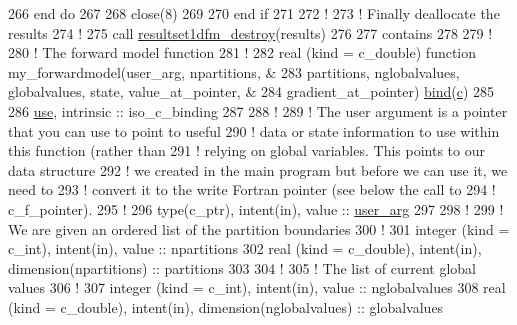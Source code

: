 \begin{DoxyCodeInclude}
266 \textcolor{keywordflow}{end do}
267 
268 \textcolor{keyword}{close}(8)
269 
270 \textcolor{keywordflow}{end if}
271 
272 \textcolor{comment}{!}
273 \textcolor{comment}{! Finally deallocate the results}
274 \textcolor{comment}{!}
275 \textcolor{keyword}{call }\hyperlink{resultset1dfm_8c_a4f089a088ba4fd4ef80d5a57b7a7f20f}{resultset1dfm\_destroy}(results)
276 
277 \textcolor{keyword}{contains}
278 
279 \textcolor{comment}{!}
280 \textcolor{comment}{! The forward model function}
281 \textcolor{comment}{!}
282 \textcolor{keyword}{real (kind = c\_double) }\textcolor{keyword}{function }my\_forwardmodel(user\_arg, npartitions, &
283      partitions, nglobalvalues, globalvalues, state, value\_at\_pointer, &
284      gradient\_at\_pointer) \hyperlink{rjmcmcf__mpi_8h_a616de1bf0c59845613650026f844fada}{bind}(\hyperlink{wellrng_8c_a6ce17b018c47d0f1d0e53a458f741ad3}{c})
285 
286   \hyperlink{rjmcmcf_8h_a821b46c311d079e47b9c09782230af02}{use}, \textcolor{keywordtype}{intrinsic} :: iso\_c\_binding 
287 
288   \textcolor{comment}{!}
289   \textcolor{comment}{! The user argument is a pointer that you can use to point to useful}
290   \textcolor{comment}{! data or state information to use within this function (rather than}
291   \textcolor{comment}{! relying on global variables. This points to our data structure }
292   \textcolor{comment}{! we created in the main program but before we can use it, we need to}
293   \textcolor{comment}{! convert it to the write Fortran pointer (see below the call to }
294   \textcolor{comment}{! c\_f\_pointer).}
295   \textcolor{comment}{!}
296   \textcolor{keywordtype}{type}(c\_ptr), \textcolor{keywordtype}{intent(in)}, \textcolor{keywordtype}{value} :: \hyperlink{rjmcmcf__mpi_8h_ab68b3a27bfe943a73cf680c2e439e070}{user\_arg}
297 
298   \textcolor{comment}{!}
299   \textcolor{comment}{! We are given an ordered list of the partition boundaries}
300   \textcolor{comment}{!}
301   \textcolor{keywordtype}{integer (kind = c\_int)}, \textcolor{keywordtype}{intent(in)}, \textcolor{keywordtype}{value} :: npartitions
302   \textcolor{keywordtype}{real (kind = c\_double)}, \textcolor{keywordtype}{intent(in)}, \textcolor{keywordtype}{dimension(npartitions)} :: partitions
303 
304   \textcolor{comment}{!}
305   \textcolor{comment}{! The list of current global values}
306   \textcolor{comment}{!}
307   \textcolor{keywordtype}{integer (kind = c\_int)}, \textcolor{keywordtype}{intent(in)}, \textcolor{keywordtype}{value} :: nglobalvalues
308   \textcolor{keywordtype}{real (kind = c\_double)}, \textcolor{keywordtype}{intent(in)}, \textcolor{keywordtype}{dimension(nglobalvalues)} :: globalvalues

\end{DoxyCodeInclude}
